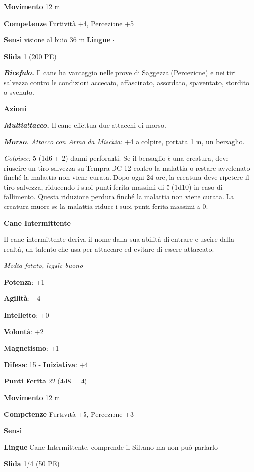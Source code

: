 \begin{multicols}{2}
\textbf{Movimento} 12 m

\textbf{Competenze} Furtività +4, Percezione +5

\textbf{Sensi} visione al buio 36 m
\textbf{Lingue} -

\textbf{Sfida} 1 (200 PE)\smallskip

\emph{\textbf{Bicefalo.}} Il cane ha vantaggio nelle prove di Saggezza
(Percezione) e nei tiri salvezza contro le condizioni accecato,
affascinato, assordato, spaventato, stordito o svenuto.

\smallskip\textbf{Azioni}

\emph{\textbf{Multiattacco.}} Il cane effettua due attacchi di morso.

\emph{\textbf{Morso.} Attacco con Arma da Mischia}: +4 a colpire,
portata 1 m, un bersaglio.

\emph{Colpisce:} 5 (1d6 + 2) danni perforanti. Se il bersaglio è una
creatura, deve riuscire un tiro salvezza su Tempra DC 12 contro la
malattia o restare avvelenato finché la malattia non viene curata. Dopo
ogni 24 ore, la creatura deve ripetere il tiro salvezza, riducendo i
suoi punti ferita massimi di 5 (1d10) in caso di fallimento. Questa
riduzione perdura finché la malattia non viene curata. La creatura muore
se la malattia riduce i suoi punti ferita massimi a 0.

\textbf{Cane Intermittente}

Il cane intermittente deriva il nome dalla sua abilità di entrare e
uscire dalla realtà, un talento che usa per attaccare ed evitare di
essere attaccato.

\emph{Media fatato, legale buono}

\textbf{Potenza}: +1

\textbf{Agilità}: +4

\textbf{Intelletto}: +0

\textbf{Volontà}: +2

\textbf{Magnetismo}: +1

\textbf{Difesa}: 15 - \textbf{Iniziativa}: +4

\textbf{Punti Ferita} 22 (4d8 + 4)

\textbf{Movimento} 12 m

\textbf{Competenze} Furtività +5, Percezione +3

\textbf{Sensi} 

\textbf{Lingue} Cane Intermittente, comprende il Silvano ma non può
parlarlo

\textbf{Sfida} 1/4 (50 PE)\smallskip


\end{multicols}
